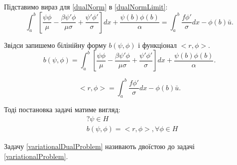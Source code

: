 \documentclass[a4paper]{article}
\numberwithin{equation}{section}
\begin{document}
Підставимо вираз для \ref{dualNorm} в \ref{dualNormLimit}:
\begin{equation}
\int_a^b [ \frac{\psi \phi}{\mu} - \frac{\beta \psi' \phi}{\mu \sigma} + \frac{\psi' \phi'}{\sigma} ]dx + \frac{\psi(b) \phi(b)}{\alpha} = \int_a^b \frac{f \phi'}{\sigma}dx - \phi(b) \bar{u}.
\end{equation}

Звідси запишемо білінійну форму $b(\psi, \phi)$ і функціонал $<r,\phi>$.
\begin{equation}
b(\psi, \phi) = \int_a^b [ \frac{\psi \phi}{\mu} - \frac{\beta \psi' \phi}{\mu \sigma} + \frac{\psi' \phi'}{\sigma} ]dx + \frac{\psi(b) \phi(b)}{\alpha}.
\end{equation}

\begin{equation}
<r, \phi> = \int_a^b \frac{f \phi'}{\sigma}dx - \phi(b) \bar{u}.
\end{equation}

Тоді постановка задачі матиме вигляд:
\begin{equation}\label{variationalDualProblem}
\begin{split}
&? \psi \in H
\\& b(\psi, \phi) = <r, \phi>, \forall \phi \in H
\end{split}
\end{equation}

Задачу \ref{variationalDualProblem} називають двоїстою до задачі \ref{variationalProblem}.
\end{document}
